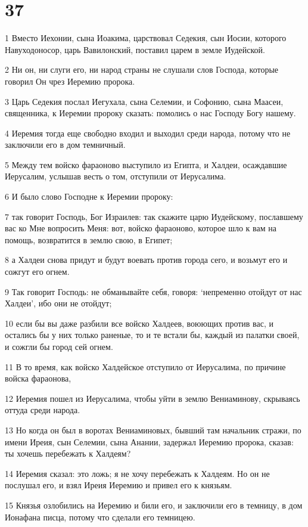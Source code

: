 \chapter{37}

\par 1 Вместо Иехонии, сына Иоакима, царствовал Седекия, сын Иосии, которого Навуходоносор, царь Вавилонский, поставил царем в земле Иудейской.
\par 2 Ни он, ни слуги его, ни народ страны не слушали слов Господа, которые говорил Он чрез Иеремию пророка.
\par 3 Царь Седекия послал Иегухала, сына Селемии, и Софонию, сына Маасеи, священника, к Иеремии пророку сказать: помолись о нас Господу Богу нашему.
\par 4 Иеремия тогда еще свободно входил и выходил среди народа, потому что не заключили его в дом темничный.
\par 5 Между тем войско фараоново выступило из Египта, и Халдеи, осаждавшие Иерусалим, услышав весть о том, отступили от Иерусалима.
\par 6 И было слово Господне к Иеремии пророку:
\par 7 так говорит Господь, Бог Израилев: так скажите царю Иудейскому, пославшему вас ко Мне вопросить Меня: вот, войско фараоново, которое шло к вам на помощь, возвратится в землю свою, в Египет;
\par 8 а Халдеи снова придут и будут воевать против города сего, и возьмут его и сожгут его огнем.
\par 9 Так говорит Господь: не обманывайте себя, говоря: `непременно отойдут от нас Халдеи', ибо они не отойдут;
\par 10 если бы вы даже разбили все войско Халдеев, воюющих против вас, и остались бы у них только раненые, то и те встали бы, каждый из палатки своей, и сожгли бы город сей огнем.
\par 11 В то время, как войско Халдейское отступило от Иерусалима, по причине войска фараонова,
\par 12 Иеремия пошел из Иерусалима, чтобы уйти в землю Вениаминову, скрываясь оттуда среди народа.
\par 13 Но когда он был в воротах Вениаминовых, бывший там начальник стражи, по имени Иреия, сын Селемии, сына Анании, задержал Иеремию пророка, сказав: ты хочешь перебежать к Халдеям?
\par 14 Иеремия сказал: это ложь; я не хочу перебежать к Халдеям. Но он не послушал его, и взял Иреия Иеремию и привел его к князьям.
\par 15 Князья озлобились на Иеремию и били его, и заключили его в темницу, в дом Ионафана писца, потому что сделали его темницею.
